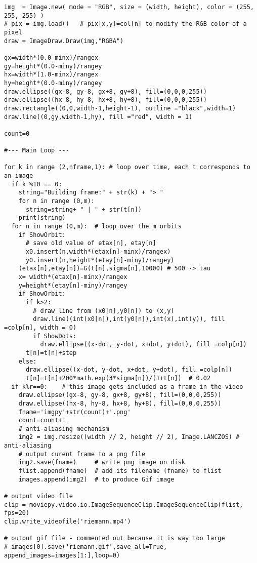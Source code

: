 \documentclass[oneside,10pt]{book}
\begin{document}
\begin{lstlisting}
img  = Image.new( mode = "RGB", size = (width, height), color = (255, 255, 255) )
# pix = img.load()   # pix[x,y]=col[n] to modify the RGB color of a pixel
draw = ImageDraw.Draw(img,"RGBA")

gx=width*(0.0-minx)/rangex
gy=height*(0.0-miny)/rangey
hx=width*(1.0-minx)/rangex
hy=height*(0.0-miny)/rangey
draw.ellipse((gx-8, gy-8, gx+8, gy+8), fill=(0,0,0,255)) 
draw.ellipse((hx-8, hy-8, hx+8, hy+8), fill=(0,0,0,255)) 
draw.rectangle((0,0,width-1,height-1), outline ="black",width=1)
draw.line((0,gy,width-1,hy), fill ="red", width = 1)

count=0

#--- Main Loop ---

for k in range (2,nframe,1): # loop over time, each t corresponds to an image
  if k %10 == 0:
    string="Building frame:" + str(k) + "> "
    for n in range (0,m):
      string=string+ " | " + str(t[n])
    print(string)
  for n in range (0,m):  # loop over the m orbits
    if ShowOrbit:
      # save old value of etax[n], etay[n]
      x0.insert(n,width*(etax[n]-minx)/rangex)  
      y0.insert(n,height*(etay[n]-miny)/rangey)
    (etax[n],etay[n])=G(t[n],sigma[n],10000) # 500 -> tau
    x= width*(etax[n]-minx)/rangex
    y=height*(etay[n]-miny)/rangey
    if ShowOrbit:
      if k>2:
        # draw line from (x0[n],y0[n]) to (x,y)
        draw.line((int(x0[n]),int(y0[n]),int(x),int(y)), fill =colp[n], width = 0)
        if ShowDots:
          draw.ellipse((x-dot, y-dot, x+dot, y+dot), fill =colp[n]) 
      t[n]=t[n]+step
    else:
      draw.ellipse((x-dot, y-dot, x+dot, y+dot), fill =colp[n]) 
      t[n]=t[n]+200*math.exp(3*sigma[n])/(1+t[n])  # 0.02  
  if k%r==0:    # this image gets included as a frame in the video
    draw.ellipse((gx-8, gy-8, gx+8, gy+8), fill=(0,0,0,255)) 
    draw.ellipse((hx-8, hy-8, hx+8, hy+8), fill=(0,0,0,255)) 
    fname='imgpy'+str(count)+'.png'
    count=count+1
    # anti-aliasing mechanism
    img2 = img.resize((width // 2, height // 2), Image.LANCZOS) # anti-aliasing
    # output curent frame to a png file
    img2.save(fname)     # write png image on disk
    flist.append(fname)  # add its filename (fname) to flist
    images.append(img2)  # to produce Gif image

# output video file
clip = moviepy.video.io.ImageSequenceClip.ImageSequenceClip(flist, fps=20) 
clip.write_videofile('riemann.mp4')

# output gif file - commented out because it is way too large
# images[0].save('riemann.gif',save_all=True, append_images=images[1:],loop=0)
\end{lstlisting}
\end{document}
